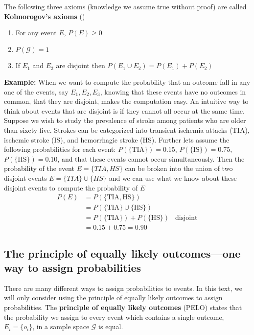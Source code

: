 The following three axioms (knowledge we assume true without proof) are called \textbf{Kolmorogov's axioms} ($\label{KA}$)
\begin{enumerate}
    \item For any event $E$, $P(E) \geq 0$
    \item $P(\mathcal{G}) = 1$
    \item If $E_{1}$ and $E_{2}$ are disjoint then $P(E_{1} \cup E_{2}) = P(E_{1}) + P(E_{2})$
\end{enumerate}

\textbf{Example:} When we want to compute the probability that an outcome fall in any one of the events, say $E_{1}, E_{2},E_{3}$, knowing that these events have no outcomes in common, that they are disjoint, makes the computation easy. An intuitive way to think about events that are disjoint is if they cannot all occur at the same time.
Suppose we wish to study the prevalence of stroke among patients who are older than sixety-five.
Strokes can be categorized into transient ischemia attacks (TIA), ischemic stroke (IS), and hemorrhagic stroke (HS).
Further lets assume the following probabilities for each event: $P(\{\text{TIA}\}) = 0.15$, $P(\{\text{IS}\}) = 0.75$, $P(\{\text{HS}\}) = 0.10$, and that these events cannot occur simultaneously. Then the probability of the event $E=\{TIA,HS\}$ can be broken into the union of two disjoint events $E = \{TIA\} \cup \{HS\}$ and we can use what we know about these disjoint events to compute the probability of $E$
\begin{align}
    P(E) &= P(\{\text{TIA},\text{HS}\} ) \\ 
         &=P(\{\text{TIA}\} \cup \{\text{HS}\} ) \\
         &=P(\{\text{TIA}\}) + P(\{\text{HS}\} ) \;\;\;\text{disjoint} \\
         &= 0.15 + 0.75 = 0.90
\end{align}

\subsection{The principle of equally likely outcomes---one way to assign probabilities}

There are many different ways to assign probabilities to events. 
In this text, we will only consider using the principle of equally likely outcomes to assign probabilities. 
The \textbf{principle of equally likely outcomes} (PELO) states that the probability we assign to every event which contains a single outcome, $E_{i} = \{o_{i}\}$, in a sample space $\mathcal{G}$ is equal.

